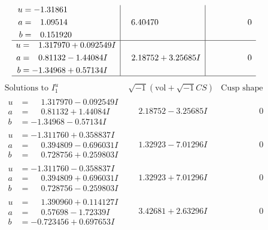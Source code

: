 \documentclass[1p]{elsarticle_modified}
\theoremstyle{definition}
\newcommand{\I}{\sqrt{-1}}
\begin{document}
$$\begin{array}{c|c|c}
\begin{aligned}
u &= -1.31861\phantom{ +0.000000I} \\
a &= \phantom{-}1.09514\phantom{ +0.000000I} \\
b &= \phantom{-}0.151920\phantom{ +0.000000I}\end{aligned}
 & \phantom{-}6.40470\phantom{ +0.000000I} & \phantom{-0.000000 } 0 \\ \hline\begin{aligned}
u &= \phantom{-}1.317970 + 0.092549 I \\
a &= \phantom{-}0.81132 - 1.44084 I \\
b &= -1.34968 + 0.57134 I\end{aligned}
 & \phantom{-}2.18752 + 3.25685 I & \phantom{-0.000000 } 0\\
 \hline 
 \end{array}$$\newpage$$\begin{array}{c|c|c}  
\text{Solutions to }I^u_{1}& \I (\text{vol} + \sqrt{-1}CS) & \text{Cusp shape}\\
 \hline 
\begin{aligned}
u &= \phantom{-}1.317970 - 0.092549 I \\
a &= \phantom{-}0.81132 + 1.44084 I \\
b &= -1.34968 - 0.57134 I\end{aligned}
 & \phantom{-}2.18752 - 3.25685 I & \phantom{-0.000000 } 0 \\ \hline\begin{aligned}
u &= -1.311760 + 0.358837 I \\
a &= \phantom{-}0.394809 - 0.696031 I \\
b &= \phantom{-}0.728756 + 0.259803 I\end{aligned}
 & \phantom{-}1.32923 - 7.01296 I & \phantom{-0.000000 } 0 \\ \hline\begin{aligned}
u &= -1.311760 - 0.358837 I \\
a &= \phantom{-}0.394809 + 0.696031 I \\
b &= \phantom{-}0.728756 - 0.259803 I\end{aligned}
 & \phantom{-}1.32923 + 7.01296 I & \phantom{-0.000000 } 0 \\ \hline\begin{aligned}
u &= \phantom{-}1.390960 + 0.114127 I \\
a &= \phantom{-}0.57698 - 1.72339 I \\
b &= -0.723456 + 0.697653 I\end{aligned}
 & \phantom{-}3.42681 + 2.63296 I & \phantom{-0.000000 } 0 \\ \hline\begin{aligned}

\end{aligned}
\end{array}$$
\end{document}

